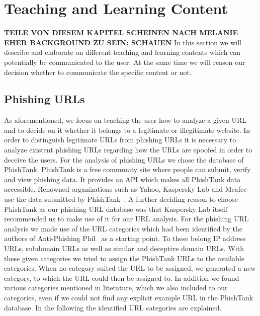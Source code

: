 \section{Teaching and Learning Content}

\textbf{TEILE VON DIESEM KAPITEL SCHEINEN NACH MELANIE EHER BACKGROUND ZU SEIN: SCHAUEN}
In this section we will describe and elaborate on different teaching and learning contents which can potentially be communicated to the user. At the same time we will reason our decision whether to communicate the specific content or not.
\subsection{Phishing URLs}
As aforementioned, we focus on teaching the user how to analyze a given URL and to decide on it whether it belongs to a legitimate or illegitimate website. In order to distinguish legitimate URLs from phishing URLs it is necessary to analyze existent phishing URLs regarding how the URLs are spoofed in order to deceive the users. For the analysis of phishing URLs we chose the database of PhishTank.
PhishTank is a free community site where people can submit, verify and view phishing data. It provides an API which makes all PhishTank data accessible. Renowned organizations such as Yahoo, Kaspersky Lab and Mcafee use the data submitted by PhishTank~\cite{phishtank}. A further deciding reason to choose PhishTank as our phishing URL database was that Kaspersky Lab itself recommended us to make use of it for our URL analysis. For the phishing URL analysis we made use of the URL categories which had been identified by the authors of Anti-Phishing Phil~\cite{sheng2007antiphishingphil} as a starting point. To these belong IP address URLs, subdomain URLs as well as similar and deceptive domain URLs. With these given categories we tried to assign the PhishTank URLs to the available categories. When no category suited the URL to be assigned, we generated a new category, to which the URL could then be assigned to. In addition we found various categories mentioned in literature, which we also included to our categories, even if we could not find any explicit example URL in the PhishTank database. In the following the identified URL categories are explained.

